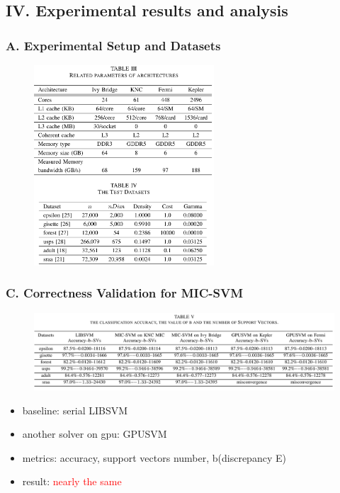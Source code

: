 \documentclass{beamer}
\begin{document}
\subsection{IV. Experimental results and analysis} 
\begin{frame}
	\frametitle{A. Experimental Setup and Datasets}	
	\begin{figure}
		\includegraphics[width=0.6\textwidth]{fig/expsetup.png}
	\end{figure} 
\end{frame}

\begin{frame}
	\frametitle{C. Correctness Validation for MIC-SVM}	
	\begin{figure}
		\includegraphics[width=1\textwidth]{fig/table5_accuracy}
	\end{figure} 
	\begin{itemize}
		\item baseline: serial LIBSVM
		\item another solver on gpu: GPUSVM	
		\item metrics: accuracy, support vectors number, b(discrepancy E)
		\item result: \textcolor{red}{nearly the same}
	\end{itemize}		
\end{frame}
\end{document}
